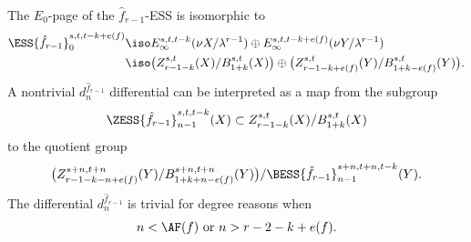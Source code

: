 \begin{definition}
The $E_0$-page of the $\hat f_{r-1}$-ESS is isomorphic to
$$\begin{aligned}
    \ESS{\hat f_{r-1}}_0^{s,t,t-k+e(f)}\iso & E_\infty^{s,t,t-k}(\nu X/\lambda^{r-1})\oplus E_\infty^{s,t,t-k+e(f)}(\nu Y/\lambda^{r-1})\\
    \iso & \big(Z_{r-1-k}^{s,t}(X)/B_{1+k}^{s,t}(X)\big)\oplus \big(Z_{r-1-k+e(f)}^{s,t}(Y)/B_{1+k-e(f)}^{s,t}(Y)\big).
\end{aligned}$$
A nontrivial $d^{\hat f_{r-1}}_n$ differential can be interpreted as a map from the subgroup
\begin{equation}\label{eq:eae450fe}
  \ZESS{\hat f_{r-1}}_{n-1}^{s,t,t-k}(X) \subset  Z_{r-1-k}^{s,t}(X)/B_{1+k}^{s,t}(X)
\end{equation}
to the quotient group
\begin{equation}\label{eq:334248d2}
    \big(Z_{r-1-k-n+e(f)}^{s+n,t+n}(Y)/B_{1+k+n-e(f)}^{s+n,t+n}(Y) \big)/\BESS{\hat f_{r-1}}_{n-1}^{s+n,t+n,t-k}(Y).
\end{equation}
The differential $d^{\hat f_{r-1}}_n$ is trivial for degree reasons when
$$n<\AF(f)\text{ or }n>r-2-k+e(f).$$




\end{definition}
